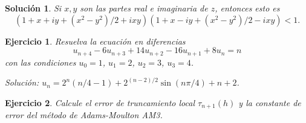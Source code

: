 \documentclass[11pt]{article}
\newtheorem{exercise}{Ejercicio}
\newtheorem*{sol}{Solución}
\begin{document}
\begin{sol}
  Si $x,y$ son las partes real e imaginaria de $z$, entonces esto es
  \begin{equation}
    (1+x+iy + (x^{2}-y^{2}) / 2 + ixy)
    (1+x-iy + (x^{2}-y^{2}) / 2 - ixy) < 1
  .\end{equation}
  
  
\end{sol}

\begin{exercise}
  Resuelva la ecuación en diferencias
  \begin{equation}
    u_{n+4} - 6u_{n+3} + 14u_{n+2} - 16 u_{n+1} + 8u_{n} = n
  \end{equation}
  con las condiciones $u_0=1$, $u_1=2$, $u_2=3$, $u_3=4$.

  \emph{Solución: $u_n=2^n(n / 4 -1) + 2^{(n-2) / 2}\sin(n\pi /
  4)+n+2$}.
\end{exercise}

\begin{exercise}
  Calcule el error de truncamiento local $\tau_{n+1}(h)$ y la
  constante de error del método de Adams-Moulton AM3.
\end{exercise}
\end{document}
